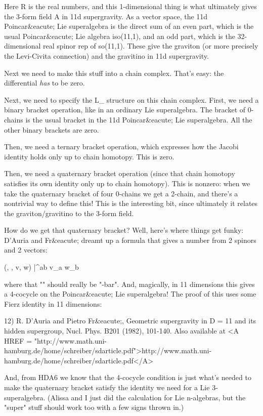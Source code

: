 Here R is the real numbers, and this 1-dimensional thing is 
what ultimately gives the 3-form field A in 11d supergravity.   
As a vector space, the 11d Poincar&eacute; Lie superalgebra is the 
direct sum of an even part, which is the usual Poincar&eacute; Lie 
algebra iso(11,1), and an odd part, which is the 32-dimensional 
real spinor rep of so(11,1).  These give the graviton (or
more precisely the Levi-Civita connection) and the gravitino
in 11d supergravity.  

Next we need to make this stuff into a chain complex.  That's
easy: the differential \emph{has} to be zero.

Next, we need to specify the L_{\infty } structure on this
chain complex.  First, we need a binary bracket operation, 
like in an ordinary Lie superalgebra.
The bracket of 0-chains is the usual bracket in the 11d Poincar&eacute; 
Lie superalgebra.  All the other binary brackets are zero.

Then, we need a ternary bracket operation, which expresses how the
Jacobi identity holds only up to chain homotopy.  This is zero.

Then, we need a quaternary bracket operation (since that
chain homotopy satisfies its own identity only up to chain
homotopy).  This is nonzero: when we take the quaternary
bracket of four 0-chains we get a 2-chain, and there's a
nontrivial way to define this!  This is the interesting bit,
since ultimately it relates the graviton/gravitino to the 
3-form field.

How do we get that quaternary bracket?  Well, here's where
things get funky: D'Auria and Fr&eacute; dreamt up a formula that 
gives a number from 2 spinors and 2 vectors: 

(\psi , \phi , v, w) |\to  \psi * \Gamma ^{ab} \phi  v_{a} w_{b}

where that "\psi *" should really be "\psi -bar".
And, magically, in 11 dimensions this gives a 4-cocycle on 
the Poincar&eacute; Lie superalgebra!  The proof of this uses some
Fierz identity in 11 dimensions:

12) R. D'Auria and Pietro Fr&eacute;, Geometric supergravity in D = 11
and its hidden supergroup, Nucl. Phys. B201 (1982), 101-140.
Also available at <A HREF = "http://www.math.uni-hamburg.de/home/schreiber/sdarticle.pdf">http://www.math.uni-hamburg.de/home/schreiber/sdarticle.pdf</A>

And, from HDA6 we know that the 4-cocycle condition is just 
what's needed to make the quaternary bracket satisfy the identity
we need for a Lie 3-superalgebra.  (Alissa and I just did the
calculation for Lie n-algebras, but the "super" stuff should work
too with a few signs thrown in.)

